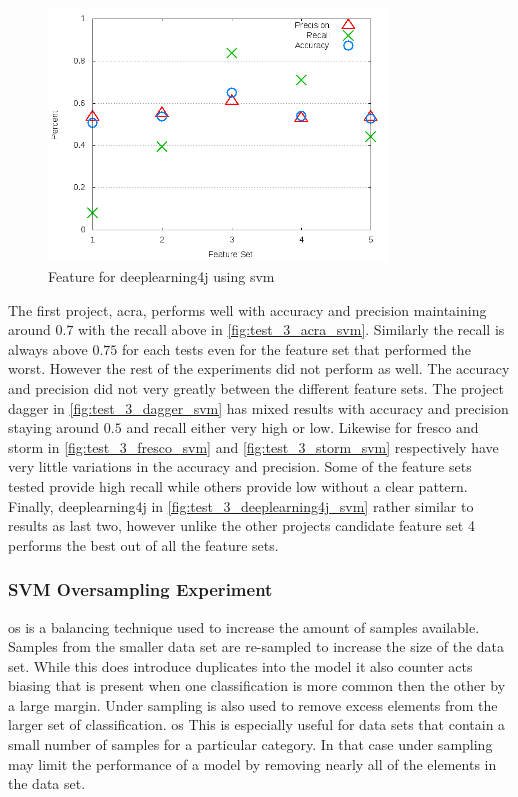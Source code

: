 \begin{figure}[!ht]
    \centering
        \includegraphics[width=0.8\textwidth]{images/svm/test_3/deeplearning4j_sample_range}
    \caption{Feature for deeplearning4j using \gls{svm}}
    \label{fig:test_3_deeplearning4j_svm}
\end{figure}

The first project, acra, performs well with accuracy and precision maintaining around $0.7$ with the recall above in \autoref{fig:test_3_acra_svm}. Similarly the recall is always above $0.75$ for each tests even for the feature set that performed the worst. However the rest of the experiments did not perform as well. The accuracy and precision did not very greatly between the different feature sets. The project dagger in \autoref{fig:test_3_dagger_svm} has mixed results with accuracy and precision staying around $0.5$ and recall either very high or low. Likewise for fresco and storm in \autoref{fig:test_3_fresco_svm} and \autoref{fig:test_3_storm_svm} respectively have very little variations in the accuracy and precision. Some of the feature sets tested provide high recall while others provide low without a clear pattern. Finally, deeplearning4j in \autoref{fig:test_3_deeplearning4j_svm} rather similar to results as last two, however unlike the other projects candidate feature set 4 performs the best out of all the feature sets.

\subsubsection{SVM Oversampling Experiment}
\label{sec:svm_os_experiment}

\gls{os} is a balancing technique used to increase the amount of samples available. Samples from the smaller data set are re-sampled to increase the size of the data set. While this does introduce duplicates into the model it also counter acts biasing that is present when one classification is more common then the other by a large margin. Under sampling is also used to remove excess elements from the larger set of classification. \gls{os} This is especially useful for data sets that contain a small number of samples for a particular category. In that case under sampling may limit the performance of a model by removing nearly all of the elements in the data set.

